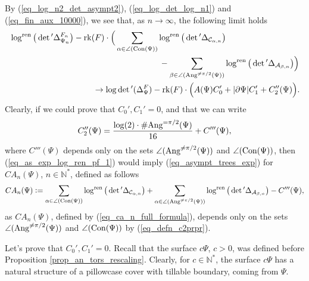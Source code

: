 \documentclass[12pt]{article}
\numberwithin{equation}{section}
\theoremstyle{theorem}
\theoremstyle{definition}
\theoremstyle{remark}
\newcommand{\nat}{\mathbb{N}}
\newcommand{\laplcomp}{\Delta}
\newcommand{\rk}[1]{{\rm{rk}} ( #1 )}
\begin{document}
	By (\ref{eq_log_n2_det_asympt2}), (\ref{eq_log_det_log_n1}) and (\ref{eq_fin_aux_10000}), we see that, as $n \to \infty$, the following limit holds
	\begin{equation}\label{eq_as_exp_log_ren_pf_1}
	\begin{aligned}
		&
		\log^{{\rm{ren}}} \big(\det{}'\laplcomp_{\Psi_n}^{F_n} \big)
		 - 
		 \rk{F}
		 \cdot
		 \Big(
		 \sum_{\alpha \in \angle({\rm{Con}}(\Psi))} \log^{{\rm{ren}}} \big(\det{}' \laplcomp_{\mathcal{C}_{\alpha, n}} \big)
		 \\
		 &
		 \qquad \qquad \qquad \qquad \qquad \qquad  \qquad \qquad \qquad
		 - 
		 \sum_{\beta \in \angle({\rm{Ang}}^{\neq \pi/2}(\Psi))} \log^{{\rm{ren}}} \big(\det{}' \laplcomp_{\mathcal{A}_{\beta, n}} \big) 
		 \Big)
		 \\
		 &
		  \qquad \qquad \qquad \qquad \qquad
		 \to
		 \log \det{}'(\laplcomp_{\Psi}^{F})
		 -
		 \rk{F}
		 \cdot
		 \Big(
			 A(\Psi) C_0'
			 +
			 |\partial \Psi| C_1'
			 +
			 C_2''(\Psi)
		 \Big).
	\end{aligned}
	\end{equation}
	Clearly, if we could prove that $C_0', C_1' = 0$, and that we can write 
	\begin{equation}\label{eq_c2_psi}
		C_2''(\Psi) = \frac{\log(2) \cdot \# {\rm{Ang}}^{= \pi/2}(\Psi)}{16} + C'''(\Psi),
	\end{equation}
	where $C'''(\Psi)$ depends only on the sets $\angle({\rm{Ang}}^{\neq \pi/2}(\Psi))$ and $\angle({\rm{Con}}(\Psi))$, then (\ref{eq_as_exp_log_ren_pf_1}) would imply (\ref{eq_asympt_trees_exp}) for $CA_n(\Psi)$, $n \in \nat^*$, defined as follows
	\begin{equation}\label{eq_ca_n_full_formula}
		CA_n(\Psi) :=  \sum_{\alpha \in \angle({\rm{Con}}(\Psi))} \log^{{\rm{ren}}} \big(\det{}' \laplcomp_{\mathcal{C}_{\alpha, n}} \big)
		 +
		 \sum_{\alpha \in \angle({\rm{Ang}}^{\neq \pi/2}(\Psi))} \log^{{\rm{ren}}} \big(\det{}' \laplcomp_{\mathcal{A}_{\beta, n}} \big) 
		 -
		 C'''(\Psi),
	\end{equation}
	as $CA_n(\Psi)$, defined by (\ref{eq_ca_n_full_formula}), depends only on the sets $\angle({\rm{Ang}}^{\neq \pi/2}(\Psi))$ and $\angle({\rm{Con}}(\Psi))$ by (\ref{eq_defn_c2prpr}).
	\par 
	Let's prove that $C_0', C_1' = 0$.
	Recall that the surface $c \Psi$, $c > 0$, was defined before Proposition \ref{prop_an_tors_rescaling}.
	Clearly, for $c \in \nat^*$, the surface $c \Psi$ has a natural structure of a pillowcase cover with tillable boundary, coming from $\Psi$.
\end{document}
